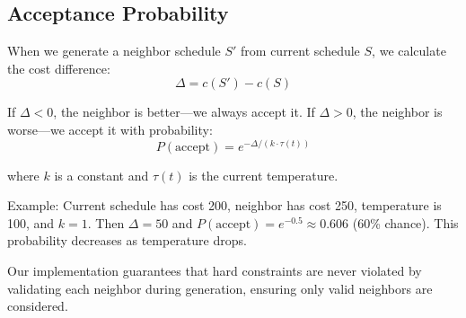 \documentclass{article}
\begin{document}
\subsection{Acceptance Probability}

When we generate a neighbor schedule $S'$ from current schedule $S$, we calculate the cost difference:
$$\Delta = c(S') - c(S)$$

If $\Delta < 0$, the neighbor is better—we always accept it. If $\Delta > 0$, the neighbor is worse—we accept it with probability:
$$P(\text{accept}) = e^{-\Delta / (k \cdot \tau(t))}$$

where $k$ is a constant and $\tau(t)$ is the current temperature.

Example: Current schedule has cost 200, neighbor has cost 250, temperature is 100, and $k=1$. Then $\Delta = 50$ and $P(\text{accept}) = e^{-0.5} \approx 0.606$ (60\% chance). This probability decreases as temperature drops.

Our implementation guarantees that hard constraints are never violated by validating each neighbor during generation, ensuring only valid neighbors are considered.
\end{document}
